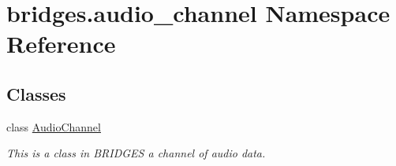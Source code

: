 \hypertarget{namespacebridges_1_1audio__channel}{}\section{bridges.\+audio\+\_\+channel Namespace Reference}
\label{namespacebridges_1_1audio__channel}
\subsection*{Classes}
\begin{DoxyCompactItemize}
\item 
class \hyperlink{classbridges_1_1audio__channel_1_1_audio_channel}{Audio\+Channel}
\begin{DoxyCompactList}\small\item\em This is a class in B\+R\+I\+D\+G\+ES a channel of audio data. \end{DoxyCompactList}\end{DoxyCompactItemize}
